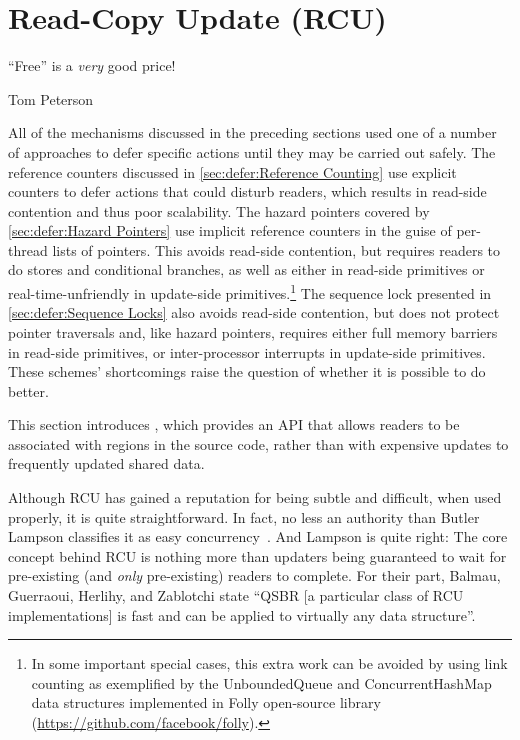 
\section{Read-Copy Update (RCU)}
\label{sec:defer:Read-Copy Update (RCU)}
%
\epigraph{``Free'' is a \emph{very} good price!}{Tom Peterson}

All of the mechanisms discussed in the preceding sections
used one of a number of approaches to defer specific actions
until they may be carried out safely.
The reference counters discussed in
\cref{sec:defer:Reference Counting}
use explicit counters to defer actions that could disturb readers,
which results in read-side contention and thus poor scalability.
The hazard pointers covered by
\cref{sec:defer:Hazard Pointers}
use implicit reference counters in the guise of per-thread lists of
pointers.
This avoids read-side contention, but requires readers to do stores and
conditional branches, as well as either 
in read-side primitives or real-time-unfriendly  in
update-side primitives.\footnote{
	In some important special cases, this extra work can be avoided
	by using link counting as exemplified by the UnboundedQueue
	and ConcurrentHashMap data structures implemented in Folly
	open-source library
	(\url{https://github.com/facebook/folly}).}
The sequence lock presented in
\cref{sec:defer:Sequence Locks}
also avoids read-side contention, but does not protect pointer
traversals and, like hazard pointers, requires either full memory barriers
in read-side primitives, or inter-processor interrupts in update-side
primitives.
These schemes' shortcomings raise the question of
whether it is possible to do better.

This section introduces , which provides
an API that allows readers to be associated with regions in the source code,
rather than with expensive updates to frequently updated shared data.

Although RCU has gained a reputation for being subtle and difficult,
when used properly, it is quite straightforward.
In fact, no less an authority than Butler Lampson classifies it as easy
concurrency~\cite{ButlerLampson2022ProgrammingConcurrentSystems}.
And Lampson is quite right:
The core concept behind RCU is nothing more than updaters being
guaranteed to wait for pre-existing (and \emph{only} pre-existing)
readers to complete.
For their part, Balmau, Guerraoui, Herlihy, and Zablotchi state
``QSBR [a particular class of RCU implementations] is fast and can be
applied to virtually any data structure''.

